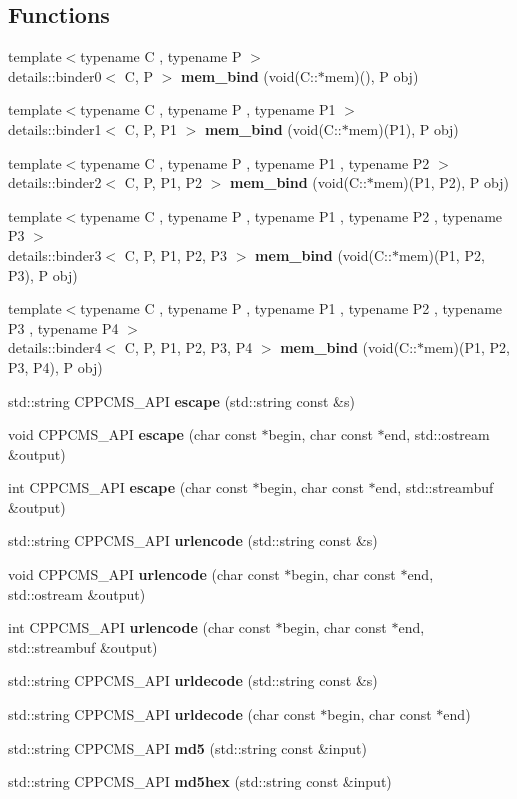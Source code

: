 \subsection*{Functions}
\begin{DoxyCompactItemize}
\item 
{\footnotesize template$<$typename C , typename P $>$ }\\details\+::binder0$<$ C, P $>$ {\bf mem\+\_\+bind} (void(C\+::$\ast$mem)(), P obj)
\item 
{\footnotesize template$<$typename C , typename P , typename P1 $>$ }\\details\+::binder1$<$ C, P, P1 $>$ {\bf mem\+\_\+bind} (void(C\+::$\ast$mem)(P1), P obj)
\item 
{\footnotesize template$<$typename C , typename P , typename P1 , typename P2 $>$ }\\details\+::binder2$<$ C, P, P1, P2 $>$ {\bf mem\+\_\+bind} (void(C\+::$\ast$mem)(P1, P2), P obj)
\item 
{\footnotesize template$<$typename C , typename P , typename P1 , typename P2 , typename P3 $>$ }\\details\+::binder3$<$ C, P, P1, P2, P3 $>$ {\bf mem\+\_\+bind} (void(C\+::$\ast$mem)(P1, P2, P3), P obj)
\item 
{\footnotesize template$<$typename C , typename P , typename P1 , typename P2 , typename P3 , typename P4 $>$ }\\details\+::binder4$<$ C, P, P1, P2, P3, P4 $>$ {\bf mem\+\_\+bind} (void(C\+::$\ast$mem)(P1, P2, P3, P4), P obj)
\item 
std\+::string C\+P\+P\+C\+M\+S\+\_\+\+A\+PI {\bf escape} (std\+::string const \&s)
\item 
void C\+P\+P\+C\+M\+S\+\_\+\+A\+PI {\bf escape} (char const $\ast$begin, char const $\ast$end, std\+::ostream \&output)
\item 
int C\+P\+P\+C\+M\+S\+\_\+\+A\+PI {\bf escape} (char const $\ast$begin, char const $\ast$end, std\+::streambuf \&output)
\item 
std\+::string C\+P\+P\+C\+M\+S\+\_\+\+A\+PI {\bf urlencode} (std\+::string const \&s)
\item 
void C\+P\+P\+C\+M\+S\+\_\+\+A\+PI {\bf urlencode} (char const $\ast$begin, char const $\ast$end, std\+::ostream \&output)
\item 
int C\+P\+P\+C\+M\+S\+\_\+\+A\+PI {\bf urlencode} (char const $\ast$begin, char const $\ast$end, std\+::streambuf \&output)
\item 
std\+::string C\+P\+P\+C\+M\+S\+\_\+\+A\+PI {\bf urldecode} (std\+::string const \&s)
\item 
std\+::string C\+P\+P\+C\+M\+S\+\_\+\+A\+PI {\bf urldecode} (char const $\ast$begin, char const $\ast$end)
\item 
std\+::string C\+P\+P\+C\+M\+S\+\_\+\+A\+PI {\bf md5} (std\+::string const \&input)
\item 
std\+::string C\+P\+P\+C\+M\+S\+\_\+\+A\+PI {\bf md5hex} (std\+::string const \&input)
\end{DoxyCompactItemize}


